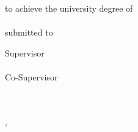 
\begin{titlepage}


%

\begin{center}
~
\vfill\vfill\vfill

\sffamily

\myauthor

\vfill

{\LARGE\bfseries\mytitle}

{\large\bfseries\mysubtitle}

\vfill\vfill\vfill\vfill

{\normalsize\bfseries\myworktitle}\\
\vfill
to achieve the university degree of\\
{\mygrade}\\
\vfill
submitted to\\
{\normalsize\bfseries\myuniversity}

\vfill\vfill\vfill
\vfill\vfill\vfill

Supervisor\\
\mysupervisor\\
\vfill
Co-Supervisor\\
\mycosupervisor\\
\vfill
\vfill
\myinstitute\\

\vfill

\myfaculty

\vfill\vfill\vfill

{\scriptsize\mysubmissiontown, \mysubmissionmonth~\mysubmissionyear}

\end{center}
\end{titlepage}

